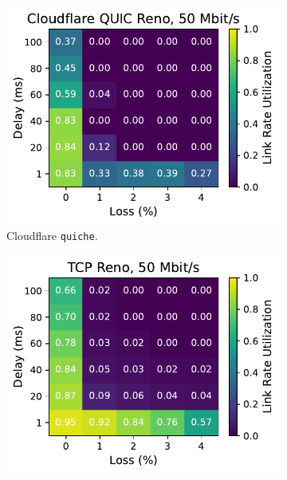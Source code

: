 \begin{figure}[ht]
\begin{subfigure}[b]{0.22\linewidth}
        \includegraphics[width=\linewidth,trim={0 0 2cm 0},clip]{splitting-paper/figures/heatmaps/heatmap_quiche_reno_50mbps.pdf}
        \caption{Cloudflare \texttt{quiche}.}
    \end{subfigure}
    \begin{subfigure}[b]{0.89cm}
        \includegraphics[width=\linewidth,trim={8cm 0 0 0},clip]{splitting-paper/figures/heatmaps/heatmap_tcp_reno_50mbps.pdf}

\end{subfigure}
\end{figure}
